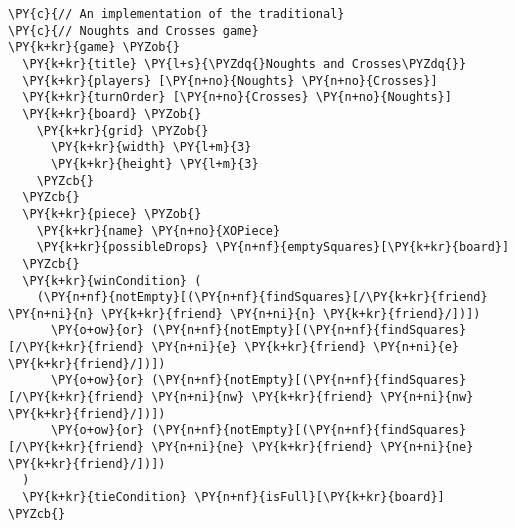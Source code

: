 \begin{Verbatim}[commandchars=\\\{\}]
\PY{c}{// An implementation of the traditional}
\PY{c}{// Noughts and Crosses game}
\PY{k+kr}{game} \PYZob{}
  \PY{k+kr}{title} \PY{l+s}{\PYZdq{}Noughts and Crosses\PYZdq{}}
  \PY{k+kr}{players} [\PY{n+no}{Noughts} \PY{n+no}{Crosses}]
  \PY{k+kr}{turnOrder} [\PY{n+no}{Crosses} \PY{n+no}{Noughts}]
  \PY{k+kr}{board} \PYZob{}
    \PY{k+kr}{grid} \PYZob{}
      \PY{k+kr}{width} \PY{l+m}{3}
      \PY{k+kr}{height} \PY{l+m}{3}
    \PYZcb{}
  \PYZcb{}
  \PY{k+kr}{piece} \PYZob{}
    \PY{k+kr}{name} \PY{n+no}{XOPiece}
    \PY{k+kr}{possibleDrops} \PY{n+nf}{emptySquares}[\PY{k+kr}{board}]
  \PYZcb{}
  \PY{k+kr}{winCondition} (
    (\PY{n+nf}{notEmpty}[(\PY{n+nf}{findSquares}[/\PY{k+kr}{friend} \PY{n+ni}{n} \PY{k+kr}{friend} \PY{n+ni}{n} \PY{k+kr}{friend}/])])
      \PY{o+ow}{or} (\PY{n+nf}{notEmpty}[(\PY{n+nf}{findSquares}[/\PY{k+kr}{friend} \PY{n+ni}{e} \PY{k+kr}{friend} \PY{n+ni}{e} \PY{k+kr}{friend}/])])
      \PY{o+ow}{or} (\PY{n+nf}{notEmpty}[(\PY{n+nf}{findSquares}[/\PY{k+kr}{friend} \PY{n+ni}{nw} \PY{k+kr}{friend} \PY{n+ni}{nw} \PY{k+kr}{friend}/])])
      \PY{o+ow}{or} (\PY{n+nf}{notEmpty}[(\PY{n+nf}{findSquares}[/\PY{k+kr}{friend} \PY{n+ni}{ne} \PY{k+kr}{friend} \PY{n+ni}{ne} \PY{k+kr}{friend}/])])
  )
  \PY{k+kr}{tieCondition} \PY{n+nf}{isFull}[\PY{k+kr}{board}]
\PYZcb{}
\end{Verbatim}
